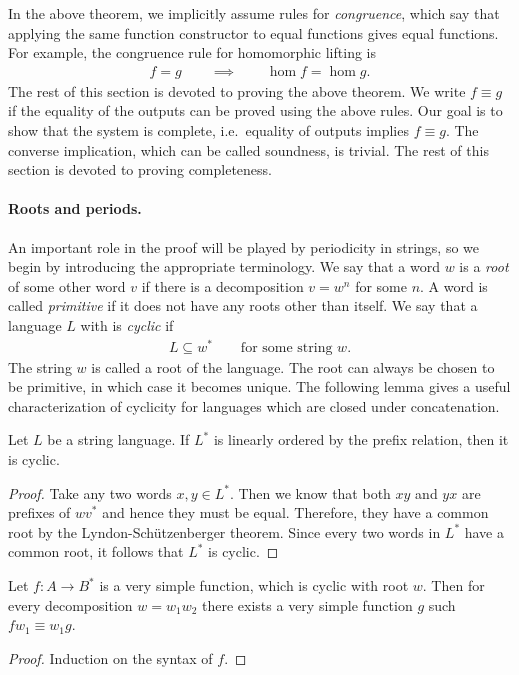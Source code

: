 In the above theorem, we implicitly assume rules for \emph{congruence}, which say that applying the same function constructor to equal functions gives equal functions. For example, the congruence rule for homomorphic lifting is 
\begin{align*}
f = g \qquad \implies \qquad \hom f = \hom g.
\end{align*}
The rest of this section is devoted to proving the above theorem.  We write $f \equiv g$ if the equality of the outputs  can be proved using the above rules. Our goal is to show that the system is complete, i.e.~equality of outputs implies $f \equiv g$. The converse implication, which can be called soundness, is trivial. The rest of this section is devoted to proving completeness.


\paragraph*{Roots and periods.} An important role in the proof will be played by periodicity in strings, so we begin by introducing the appropriate terminology. We say that a word $w$ is a \emph{root} of some other word $v$ if there is a decomposition $v = w^n$ for some $n$. A word is called \emph{primitive} if it does not have any roots other than itself. We say that a language $L$  with   is \emph{cyclic} if 
\begin{align*}
L \subseteq w^*  \qquad \text{for some string $w$.}
\end{align*}
The string $w$ is called a root of the language. The root can always be chosen to be primitive, in which case it becomes unique. The following lemma gives a useful characterization of cyclicity for languages which are closed under concatenation. 

\begin{lemma}\label{lem:almost-periodic-lemma} Let $L$ be a string language. If $L^*$ is linearly ordered by the prefix relation, then it is cyclic.
\end{lemma}
\begin{proof}
    Take any two words $x,y \in L^*$. Then we know that both $xy$ and $yx$ are prefixes of $wv^*$ and hence they must be equal. Therefore, they have a common root by the Lyndon-Sch\"utzenberger theorem. Since every two words in $L^*$ have a common root, it follows that $L^*$ is cyclic.
\end{proof}

\begin{lemma}\label{lem:cyclic-shift-lemma}
    Let $f : A \to B^*$ is a very simple function, which is cyclic with  root $w$.  Then for every decomposition $w = w_1 w_2$  there exists a very simple function $g$ such $
    f w_1 \equiv w_1 g.$
\end{lemma}
\begin{proof}
    Induction on the syntax of $f$. 
\end{proof}


